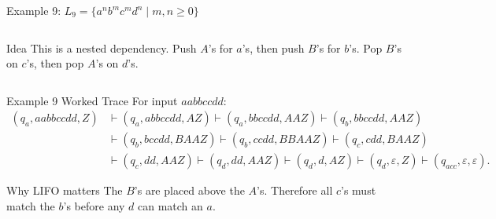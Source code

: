 \documentclass[aspectratio=169,10pt]{beamer}
\newcommand{\eps}{\varepsilon}
\newcommand{\turn}{\vdash}
\begin{document}
\begin{frame}{Example 9: \(L_9=\{a^n b^m c^m d^n\mid m,n\ge0\}\)}
\small
\begin{columns}[T,onlytextwidth]
\begin{block}{Idea}
This is a nested dependency.  Push \(A\)'s for \(a\)'s, then push \(B\)'s for \(b\)'s.  Pop \(B\)'s on \(c\)'s, then pop \(A\)'s on \(d\)'s.
\end{block}

\centering
{}
\end{columns}
\end{frame}

\begin{frame}{Example 9 Worked Trace}
\small
For input \(aabbccdd\):
\[
\begin{aligned}
(q_a,aabbccdd,Z)&\turn(q_a,abbccdd,AZ)\turn(q_a,bbccdd,AAZ)\turn(q_b,bbccdd,AAZ)\\
&\turn(q_b,bccdd,BAAZ)\turn(q_b,ccdd,BBAAZ)\turn(q_c,cdd,BAAZ)\\
&\turn(q_c,dd,AAZ)\turn(q_d,dd,AAZ)\turn(q_d,d,AZ)\turn(q_d,\eps,Z)\turn(q_{acc},\eps,\eps).
\end{aligned}
\]

\begin{exampleblock}{Why LIFO matters}
The \(B\)'s are placed above the \(A\)'s.  Therefore all \(c\)'s must match the \(b\)'s before any \(d\) can match an \(a\).
\end{exampleblock}
\end{frame}
\end{document}
